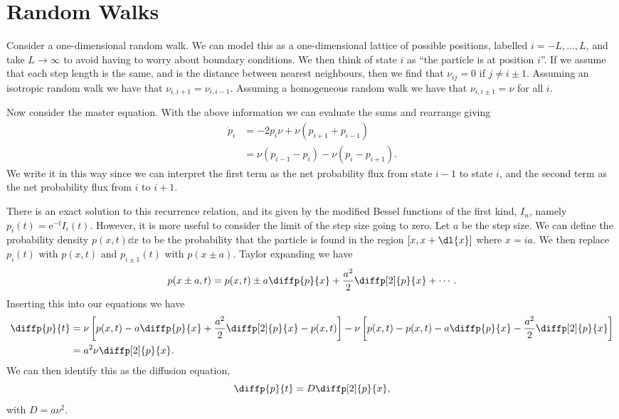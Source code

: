 \documentclass[fleqn]{NotesClass}
\newcommand*{\e}{\mathrm{e}}
\begin{document}
    \section{Random Walks}
    Consider a one-dimensional random walk.
    We can model this as a one-dimensional lattice of possible positions, labelled \(i = -L, \dotsc, L\), and take \(L \to \infty\) to avoid having to worry about boundary conditions.
    We then think of state \(i\) as \enquote{the particle is at position \(i\)}.
    If we assume that each step length is the same, and is the distance between nearest neighbours, then we find that \(\nu_{ij} = 0\) if \(j \ne i \pm 1\).
    Assuming an isotropic random walk we have that \(\nu_{i,i+1} = \nu_{i,i-1}\).
    Assuming a homogeneous random walk we have that \(\nu_{i,i\pm 1} = \nu\) for all \(i\).
    
    Now consider the master equation.
    With the above information we can evaluate the sums and rearrange giving
    \begin{align}
        \dot{p}_i &= -2p_i\nu + \nu(p_{i + 1} + p_{i - 1})\\
        &= \nu(p_{i - 1} - p_i) - \nu(p_i - p_{i + 1}).
    \end{align}
    We write it in this way since we can interpret the first term as the net probability flux from state \(i - 1\) to state \(i\), and the second term as the net probability flux from \(i\) to \(i + 1\).
    
    There is an exact solution to this recurrence relation, and its given by the modified Bessel functions of the first kind, \(I_n\), namely \(p_i(t) = \e^{-t}I_i(t)\).
    However, it is more useful to consider the limit of the step size going to zero.
    Let \(a\) be the step size.
    We can define the probability density \(p(x, t) \dd{x}\) to be the probability that the particle is found in the region \([x, x + \dl{x}]\) where \(x = ia\).
    We then replace \(p_i(t)\) with \(p(x, t)\) and \(p_{i\pm 1}(t)\) with \(p(x\pm a)\).
    Taylor expanding we have
    \begin{equation}
        p(x \pm a, t) = p(x, t) \pm a\diffp{p}{x} + \frac{a^2}{2} \diffp[2]{p}{x} + \dotsb.
    \end{equation}
    Inserting this into our equations we have
    \begin{align}
        \diffp{p}{t} &= \nu\left[ p(x, t) - a\diffp{p}{x} + \frac{a^2}{2} \diffp[2]{p}{x} - p(x, t) \right] - \nu\left[ p(x, t) - p(x, t) - a\diffp{p}{x} - \frac{a^2}{2} \diffp[2]{p}{x} \right]\\
        &= a^2\nu\diffp[2]{p}{x}.
    \end{align}
    We can then identify this as the diffusion equation,
    \begin{equation}
        \diffp{p}{t} = D\diffp[2]{p}{x},
    \end{equation}
    with \(D = a\nu^2\).
    
\end{document}
